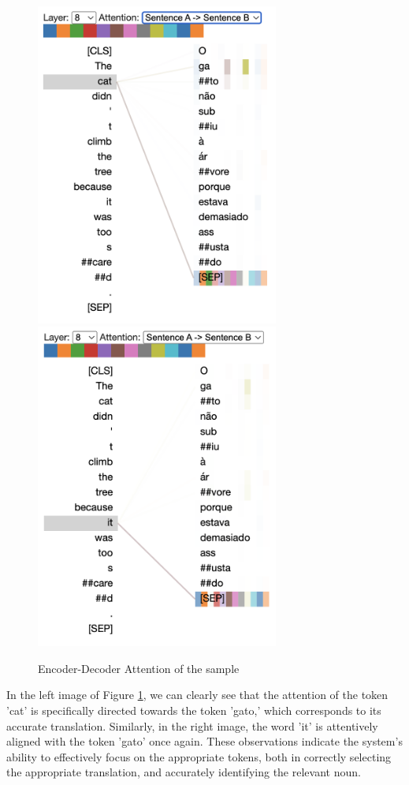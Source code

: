 \begin{figure}[h]
    \centering
    \includegraphics[width=8cm]{pages/imgs/att_cat_sample.png}
    \includegraphics[width=8cm]{pages/imgs/att_it_sample.png}
    \caption{Encoder-Decoder Attention of the sample}
    \label{fig:ed_att_sample}
\end{figure}

In the left image of Figure \ref{fig:ed_att_sample}, we can clearly see that the attention of the token 'cat' is specifically directed towards the token 'gato,' which corresponds to its accurate translation. Similarly, in the right image, the word 'it' is attentively aligned with the token 'gato' once again. These observations indicate the system's ability to effectively focus on the appropriate tokens, both in correctly selecting the appropriate translation, and accurately identifying the relevant noun.


